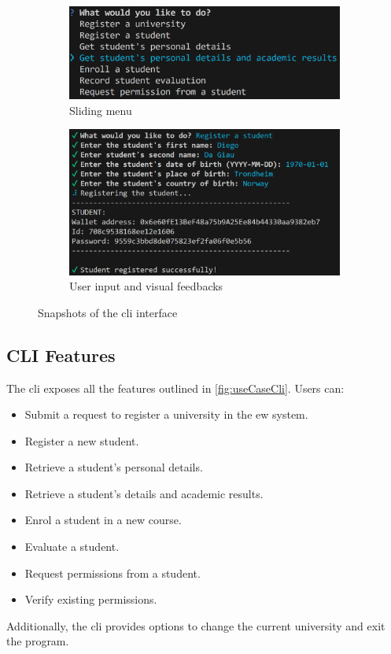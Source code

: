 \begin{figure}
    \centering
    \begin{subfigure}{.5\textwidth}
        \centering
        \includegraphics[width=\textwidth]{figures/CLI screen 1.png}
        \caption{Sliding menu}
        \label{sfig:cliDesign1}
    \end{subfigure}
    \hfill
    \begin{subfigure}{.60\textwidth}
        \centering
        \includegraphics[width=\textwidth]{figures/CLI screen 2.png}
        \caption{User input and visual feedbacks}
        \label{sfig:cliDesign2}
    \end{subfigure}
    \caption[Different aspects of the \acrshort{cli} interface.]{Snapshots of the \acrshort{cli} interface}
    \label{fig:clifigs}
\end{figure}

\subsection{CLI Features}
The \acrshort{cli} exposes all the features outlined in \cref{fig:useCaseCli}. Users can:
\begin{itemize}
    \item Submit a request to register a university in the \acrshort{ew} system.
    \item Register a new student.
    \item Retrieve a student’s personal details.
    \item Retrieve a student’s details and academic results.
    \item Enrol a student in a new course.
    \item Evaluate a student.
    \item Request permissions from a student.
    \item Verify existing permissions.
\end{itemize}
Additionally, the \acrshort{cli} provides options to change the current university and exit the program.

